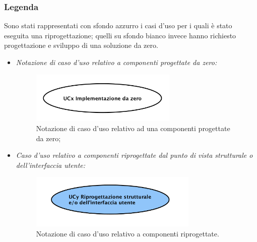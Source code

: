 	\subsubsection{Legenda}
	Sono stati rappresentati con sfondo azzurro i casi d'uso per i quali è stato eseguita una riprogettazione; quelli su sfondo bianco  invece hanno richiesto progettazione e sviluppo di una soluzione da zero.
	\begin{itemize}
		\item \textit{Notazione di caso d'uso relativo a  componenti progettate da zero:}
		\begin{figure}[H]
			\begin{center}
				\includegraphics[width=7cm]{Pics/UCDaZero.png}
				\caption{Notazione di caso d'uso  relativo ad una componenti progettate da zero;}
				\label{fig:DiagrammaUCDaZero}
			\end{center}
		\end{figure}
		\item \textit{Caso d'uso relativo a componenti riprogettate dal punto di vista strutturale o dell'interfaccia utente:}
				 	\begin{figure}[H]
				 		\begin{center}
				 			\includegraphics[width=8cm]{Pics/UCRestaurato.png}
				 			\caption{Notazione di caso d'uso relativo a componenti riprogettate.}
				 			\label{fig:DiagrammaUCRiprogettato}
				 		\end{center}
				 	\end{figure}		
	\end{itemize}
	\newpage
